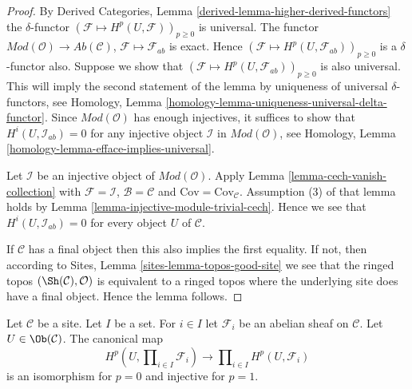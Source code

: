 \begin{proof}
By
Derived Categories, Lemma \ref{derived-lemma-higher-derived-functors}
the $\delta$-functor $(\mathcal{F} \mapsto H^p(U, \mathcal{F}))_{p \geq 0}$
is universal. The functor
$\textit{Mod}(\mathcal{O}) \to \textit{Ab}(\mathcal{C})$,
$\mathcal{F} \mapsto \mathcal{F}_{ab}$ is exact. Hence
$(\mathcal{F} \mapsto H^p(U, \mathcal{F}_{ab}))_{p \geq 0}$
is a $\delta$-functor also. Suppose we show that
$(\mathcal{F} \mapsto H^p(U, \mathcal{F}_{ab}))_{p \geq 0}$
is also universal. This will imply the second statement of the lemma
by uniqueness of universal $\delta$-functors, see
Homology, Lemma \ref{homology-lemma-uniqueness-universal-delta-functor}.
Since $\textit{Mod}(\mathcal{O})$ has enough injectives,
it suffices to show that $H^i(U, \mathcal{I}_{ab}) = 0$
for any injective object $\mathcal{I}$ in $\textit{Mod}(\mathcal{O})$, see
Homology, Lemma \ref{homology-lemma-efface-implies-universal}.

\medskip\noindent
Let $\mathcal{I}$ be an injective object of $\textit{Mod}(\mathcal{O})$.
Apply Lemma \ref{lemma-cech-vanish-collection}
with $\mathcal{F} = \mathcal{I}$, $\mathcal{B} = \mathcal{C}$
and $\text{Cov} = \text{Cov}_\mathcal{C}$.
Assumption (3) of that lemma holds by
Lemma \ref{lemma-injective-module-trivial-cech}.
Hence we see that $H^i(U, \mathcal{I}_{ab}) = 0$
for every object $U$ of $\mathcal{C}$.

\medskip\noindent
If $\mathcal{C}$ has a final
object then this also implies the first equality. If not, then
according to Sites, Lemma \ref{sites-lemma-topos-good-site} we see that
the ringed topos $(\Sh(\mathcal{C}), \mathcal{O})$ is equivalent to a
ringed topos where the underlying site does have a final object.
Hence the lemma follows.
\end{proof}

\begin{lemma}
\label{lemma-cohomology-products}
Let $\mathcal{C}$ be a site. Let $I$ be a set. For $i \in I$ let 
$\mathcal{F}_i$ be an abelian sheaf on $\mathcal{C}$. Let
$U \in \Ob(\mathcal{C})$. The canonical map
$$
H^p(U, \prod\nolimits_{i \in I} \mathcal{F}_i)
\longrightarrow
\prod\nolimits_{i \in I} H^p(U, \mathcal{F}_i)
$$
is an isomorphism for $p = 0$ and injective for $p = 1$.
\end{lemma}

